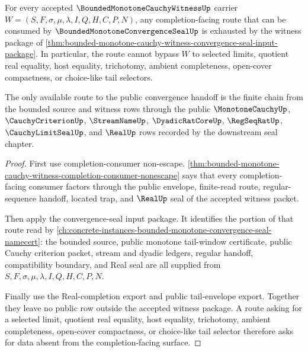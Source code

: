 \begin{theorem}
\label{thm:bounded-monotone-cauchy-witness-completion-route-exhaustion}
For every accepted $\BoundedMonotoneCauchyWitnessUp$ carrier $W=(S,F,\sigma,\mu,\lambda,I,Q,H,C,P,N)$, any completion-facing route that can be consumed by $\BoundedMonotoneConvergenceSealUp$ is exhausted by the witness package of \autoref{thm:bounded-monotone-cauchy-witness-convergence-seal-input-package}. In particular, the route cannot bypass $W$ to selected limits, quotient real equality, host equality, trichotomy, ambient completeness, open-cover compactness, or choice-like tail selectors.

The only available route to the public convergence handoff is the finite chain from the bounded source and witness rows through the public $\MonotoneCauchyUp$, $\CauchyCriterionUp$, $\StreamNameUp$, $\DyadicRatCoreUp$, $\RegSeqRatUp$, $\CauchyLimitSealUp$, and $\RealUp$ rows recorded by the downstream seal chapter.
\end{theorem}
\begin{proof}
First use completion-consumer non-escape. \autoref{thm:bounded-monotone-cauchy-witness-completion-consumer-nonescape} says that every completion-facing consumer factors through the public envelope, finite-read route, regular-sequence handoff, located trap, and $\RealUp$ seal of the accepted witness packet.

Then apply the convergence-seal input package. It identifies the portion of that route read by \autoref{ch:concrete-instances-bounded-monotone-convergence-seal-namecert}: the bounded source, public monotone tail-window certificate, public Cauchy criterion packet, stream and dyadic ledgers, regular handoff, compatibility boundary, and Real seal are all supplied from $S,F,\sigma,\mu,\lambda,I,Q,H,C,P,N$.

Finally use the Real-completion export and public tail-envelope export. Together they leave no public row outside the accepted witness package. A route asking for a selected limit, quotient real equality, host equality, trichotomy, ambient completeness, open-cover compactness, or choice-like tail selector therefore asks for data absent from the completion-facing surface.
\end{proof}

